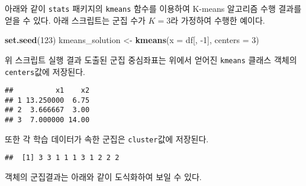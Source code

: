 \documentclass[]{book}
\newenvironment{Shaded}{\begin{snugshade}}{\end{snugshade}}
\newcommand{\DataTypeTok}[1]{\textcolor[rgb]{0.13,0.29,0.53}{#1}}
\newcommand{\DecValTok}[1]{\textcolor[rgb]{0.00,0.00,0.81}{#1}}
\newcommand{\KeywordTok}[1]{\textcolor[rgb]{0.13,0.29,0.53}{\textbf{#1}}}
\newcommand{\NormalTok}[1]{#1}
\newcommand{\OperatorTok}[1]{\textcolor[rgb]{0.81,0.36,0.00}{\textbf{#1}}}
\newcommand{\StringTok}[1]{\textcolor[rgb]{0.31,0.60,0.02}{#1}}
\begin{document}
아래와 같이 \texttt{stats} 패키지의 \texttt{kmeans} 함수를 이용하여 K-means 알고리즘 수행 결과를 얻을 수 있다. 아래 스크립트는 군집 수가 \(K = 3\)라 가정하여 수행한 예이다.

\begin{Shaded}
\begin{Highlighting}[]
\KeywordTok{set.seed}\NormalTok{(}\DecValTok{123}\NormalTok{)}
\NormalTok{kmeans_solution <-}\StringTok{ }\KeywordTok{kmeans}\NormalTok{(}\DataTypeTok{x =}\NormalTok{ df[, }\DecValTok{-1}\NormalTok{], }\DataTypeTok{centers =} \DecValTok{3}\NormalTok{)}
\end{Highlighting}
\end{Shaded}

위 스크립트 실행 결과 도출된 군집 중심좌표는 위에서 얻어진 \texttt{kmeans} 클래스 객체의 \texttt{centers}값에 저장된다.

\begin{Shaded}
\end{Shaded}

\begin{verbatim}
##          x1    x2
## 1 13.250000  6.75
## 2  3.666667  3.00
## 3  7.000000 14.00
\end{verbatim}

또한 각 학습 데이터가 속한 군집은 \texttt{cluster}값에 저장된다.

\begin{Shaded}
\end{Shaded}

\begin{verbatim}
##  [1] 3 3 1 1 1 3 1 2 2 2
\end{verbatim}

객체의 군집결과는 아래와 같이 도식화하여 보일 수 있다.

\begin{Shaded}
\end{Shaded}
\end{document}
